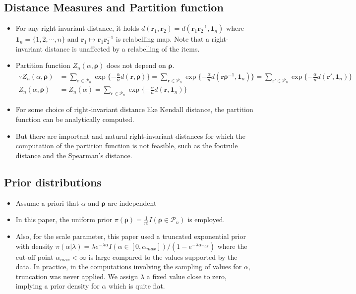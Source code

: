 \documentclass[12pt]{article}
\begin{document}
\subsection{Distance Measures and Partition function}
\begin{itemize}
    \item For any right-invariant distance, it holds $d(\mathbf{r}_1, \mathbf{r}_2)=d(\mathbf{r}_1 \mathbf{r}_2^{-1}, \mathbf{1}_n)$ where $\mathbf{1}_n=\{1,2,\cdots,n\}$ and $\mathbf{r}_1 \mapsto \mathbf{r}_1 \mathbf{r}_2^{-1}$ is relabelling map. Note that a right-invariant distance is unaffected by a relabelling of the items.
    \item Partition function $Z_n(\alpha, \boldsymbol{\rho})$ does not depend on $\boldsymbol{{\rho}}$. 
    \begin{align*}
    \because Z_n(\alpha, \boldsymbol{\rho}) &= \sum_{\mathbf{r}\in \mathcal{P}_n}\exp\{-\frac{\alpha}{n}d(\mathbf{r},\boldsymbol{\rho})\} = \sum_{\mathbf{r}\in \mathcal{P}_n}\exp\{-\frac{\alpha}{n}d(\mathbf{r} \boldsymbol{\rho}^{-1}, \mathbf{1}_n)\}=\sum_{\mathbf{r'}\in \mathcal{P}_n}\exp\{-\frac{\alpha}{n}d(\mathbf{r'},\mathbf{1}_n)\} \\ Z_n(\alpha, \boldsymbol{\rho}) &= Z_n(\alpha)=\sum_{\mathbf{r}\in \mathcal{P}_n}\exp\{-\frac{\alpha}{n}d(\mathbf{r},\mathbf{1}_n)\}
    \end{align*}
    \item For some choice of right-invariant distance like Kendall distance, the partition function can be analytically computed. 
    \item But there are important and natural right-invariant distances for which the computation of the partition function is not feasible, such as the footrule distance and the Spearman's distance.
\end{itemize}
\subsection{Prior distributions}
\begin{itemize}
    \item Assume a priori that $\alpha$ and $\boldsymbol{\rho}$ are independent
    \item In this paper, the uniform prior $\pi(\boldsymbol{\rho})=\frac{1}{n!}I(\boldsymbol{\rho}\in \mathcal{P}_n)$ is employed.
    \item Also, for the scale parameter, this paper used a truncated exponential prior with density $\pi(\alpha | \lambda)=\lambda e^{-\lambda \alpha}I(\alpha\in [0, \alpha_{max}])/(1-e^{-\lambda \alpha_{max}})$ where the cut-off point $\alpha_{max}<\infty$ is large compared to the values supported by the data. In practice, in the computations involving the sampling of values for $\alpha$, truncation was never applied. We assign $\lambda$ a fixed value close to zero, implying a prior density for $\alpha$ which is quite flat.
\end{itemize}
\end{document}
